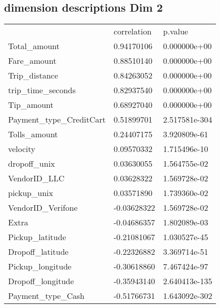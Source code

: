 \documentclass{article}
\begin{document}
\subsection{dimension descriptions Dim 2}
\label{my-label}
\begin{tabular}{lll}
 & correlation   &    p.value \\
Total\_amount            &  0.94170106 &  0.000000e+00 \\
Fare\_amount             &  0.88510140 &  0.000000e+00 \\
Trip\_distance           &  0.84263052 &  0.000000e+00 \\
trip\_time\_seconds       &  0.82937540 &  0.000000e+00 \\
Tip\_amount              &  0.68927040 &  0.000000e+00 \\
Payment\_type\_CreditCart &  0.51899701 & 2.517581e-304 \\
Tolls\_amount            &  0.24407175  & 3.920809e-61 \\
velocity                &  0.09570332  & 1.715496e-10 \\
dropoff\_unix            &  0.03630055  & 1.564755e-02 \\
VendorID\_LLC            &  0.03628322  & 1.569728e-02 \\
pickup\_unix             &  0.03571890  & 1.739360e-02 \\
VendorID\_Verifone       & -0.03628322  & 1.569728e-02 \\
Extra                   & -0.04686357  & 1.802089e-03 \\
Pickup\_latitude         & -0.21081067  & 1.030527e-45 \\
Dropoff\_latitude        & -0.22326882  & 3.369714e-51 \\
Pickup\_longitude        & -0.30618860  & 7.467424e-97 \\
Dropoff\_longitude       & -0.35943140 & 2.640413e-135 \\
Payment\_type\_Cash       & -0.51766731 & 1.643092e-302
\end{tabular}
\end{document}
